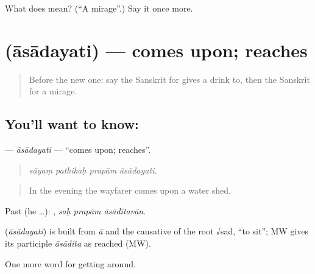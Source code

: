 \begin{tcolorbox}[breakable,colback=teal!4,colframe=teal!35!black,title={Before you move on}]
What does  mean? (\textquotedblleft{}A mirage\textquotedblright{}.) Say it once more.
\end{tcolorbox}
\section[\texorpdfstring{\sk{आसादयति} (āsādayati)}{आसादयति (āsādayati)}]{ (āsādayati) — comes upon; reaches}

\label{lesson:SA-C420-asadayati}



\begin{quote}
Before the new one: say the Sanskrit for gives a drink to, then the Sanskrit for a mirage.
\end{quote}

\subsection*{You'll want to know: }
\textbf{} — \emph{āsādayati} — \textquotedblleft{}comes upon; reaches\textquotedblright{}.

\begin{quote}
   
\end{quote}

\begin{quote}
\emph{sāyaṃ pathikaḥ prapām āsādayati.}
\end{quote}

\begin{quote}
In the evening the wayfarer comes upon a water shed.
\end{quote}

Past (he …):   , \emph{saḥ prapām āsāditavān}.

\begin{cousinweb}
\textbf{} (\emph{āsādayati}) is built from \emph{ā} and the causative of the root √sad, \textquotedblleft{}to sit\textquotedblright{}; MW gives its participle \emph{āsādita} as reached (MW).
\end{cousinweb}

\begin{grammarlens}[title={What you've built}]
One more word for getting around.
\end{grammarlens}

